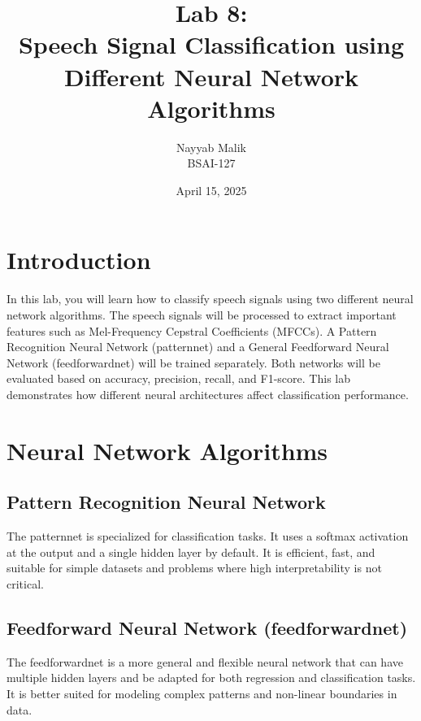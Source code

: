 \documentclass[a4paper,12pt]{article}
\title{\textbf{Lab 8:\\
Speech Signal Classification using Different Neural Network Algorithms}}
\author{Nayyab Malik\\BSAI-127}
\date{April 15, 2025}
\begin{document}
\maketitle
\tableofcontents
\newpage

\section{Introduction}
In this lab, you will learn how to classify speech signals using two different neural network algorithms.
The speech signals will be processed to extract important features such as Mel-Frequency Cepstral
Coefficients (MFCCs). A Pattern Recognition Neural Network (patternnet) and a General Feedforward
Neural Network (feedforwardnet) will be trained separately. Both networks will be evaluated based on
accuracy, precision, recall, and F1-score. This lab demonstrates how different neural architectures affect
classification performance.

\section{Neural Network Algorithms}

\subsection{Pattern Recognition Neural Network}
The patternnet is specialized for classification tasks. It uses a softmax activation at the output and a
single hidden layer by default. It is efficient, fast, and suitable for simple datasets and problems where
high interpretability is not critical.

\subsection{Feedforward Neural Network (feedforwardnet)}
The feedforwardnet is a more general and flexible neural network that can have multiple hidden layers
and be adapted for both regression and classification tasks. It is better suited for modeling complex
patterns and non-linear boundaries in data.
\end{document}
